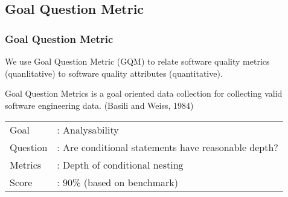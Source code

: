 \subsection{Goal Question Metric}
\begin{frame}
\label{subsection:goal_question_metric}
\frametitle{Goal Question Metric}

We use Goal Question Metric (GQM) to relate software quality metrics (quanlitative) to software quality attributes (quantitative).

\begin{definition}
Goal Question Metrics is a goal oriented data collection for collecting valid software engineering data. (Basili and Weiss, 1984)
\end{definition} \pause

\begin{example}
\begin{tabular}{ l l }
Goal &: Analysability \\
Question &: Are conditional statements have reasonable depth? \\
Metrics &: Depth of conditional nesting\\
Score &: 90\% (based on benchmark)\\
\end{tabular}
\end{example}

\hyperlink{appendix:goal_question_metric}{}

\end{frame}

